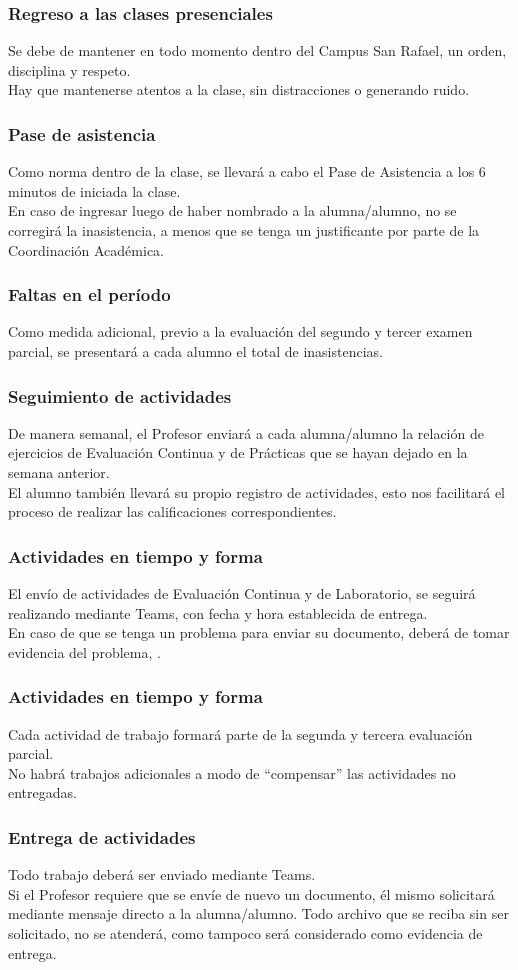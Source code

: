 \documentclass[14pt]{beamer}
\begin{document}
\begin{frame}
\frametitle{Regreso a las clases presenciales}
Se debe de mantener en todo momento dentro del Campus San Rafael, un orden, disciplina y respeto.
\\
\bigskip
\pause
Hay que mantenerse atentos a la clase, sin distracciones o generando ruido.
\end{frame}
\begin{frame}
\frametitle{Pase de asistencia}
Como norma dentro de la clase, se llevará a cabo el Pase de Asistencia a los 6 minutos de iniciada la clase.
\\
\bigskip
\pause
En caso de ingresar luego de haber nombrado a la alumna/alumno, no se corregirá la inasistencia, a menos que se tenga un justificante por parte de la Coordinación Académica.
\end{frame}
\begin{frame}
\frametitle{Faltas en el período}
Como medida adicional, previo a la evaluación del segundo y tercer examen parcial, se presentará a cada alumno el total de inasistencias.
\end{frame}
\begin{frame}
\frametitle{Seguimiento de actividades}
De manera semanal, el Profesor enviará a cada alumna/alumno la relación de ejercicios de Evaluación Continua y de Prácticas que se hayan dejado en la semana anterior.
\\
\bigskip
\pause
El alumno también llevará su propio registro de actividades, esto nos facilitará el proceso de realizar las calificaciones correspondientes.
\end{frame}
\begin{frame}
\frametitle{Actividades en tiempo y forma}
El envío de actividades de Evaluación Continua y de Laboratorio, se seguirá realizando mediante Teams, con fecha y hora establecida de entrega.
\\
\bigskip
\pause
En caso de que se tenga un problema para enviar su documento, deberá de tomar evidencia del problema, .
\end{frame}
\begin{frame}
\frametitle{Actividades en tiempo y forma}
Cada actividad de trabajo formará parte de la segunda y tercera evaluación parcial.
\\
\bigskip
\pause
No habrá trabajos adicionales a modo de \enquote{compensar} las actividades no entregadas.
\end{frame}
\begin{frame}
\frametitle{Entrega de actividades}
Todo trabajo deberá ser enviado mediante Teams.
\\
\bigskip
\pause
Si el Profesor requiere que se envíe de nuevo un documento, él mismo solicitará mediante mensaje directo a la alumna/alumno. \pause Todo archivo que se reciba sin ser solicitado, no se atenderá, como tampoco será considerado como evidencia de entrega.
\end{frame}
\end{document}
